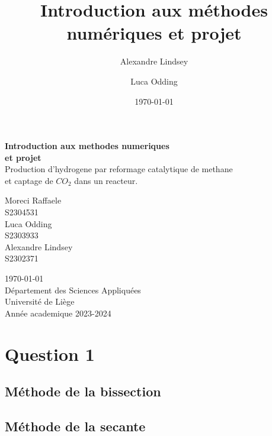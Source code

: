 \documentclass[12pt, a4paper]{report}
\title{\textbf{Introduction aux méthodes numériques et projet}}
\author{
    Alexandre Lindsey
    \and Luca Odding
}
\date{\today}
\begin{document}
    \begin{titlepage}
        \begin{center}
            \Large{\textbf{Introduction aux methodes numeriques\\
            et projet}}\\
            \vspace{0.5cm}
            \large{Production d'hydrogene par reformage catalytique de methane\\
            et captage de $CO_{2}$ dans un reacteur.}

            \vspace{5cm}
            \begin{multicols}{3}
                \normalsize{
                    Moreci Raffaele\\
                    S2304531\\
                    Luca Odding\\
                    S2303933\\
                    Alexandre Lindsey\\
                    S2302371
                }
            \end{multicols}

            \vfill{}
            \normalsize{\today}\\
            \vspace{1.5cm}
            \normalsize{
                Département des Sciences Appliquées\\
                Université de Liège\\
                Année academique 2023-2024\\
            }
        \end{center}
    \end{titlepage}

    
    \tableofcontents

    \chapter{Question 1}
        \section{Méthode de la bissection}

        \section{Méthode de la secante}
\end{document}
